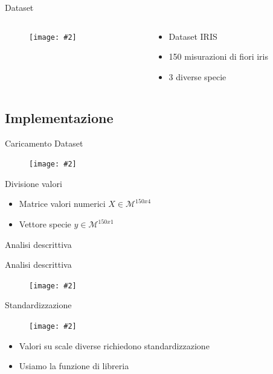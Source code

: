 \documentclass[xcolor={dvipsnames}]{beamer}
\newcommand{\codice}[2]{}
\newcommand{\figcen}[2]{
	\begin{figure}
		\begin{center}
			\texttt{[image: \#2]}
		\end{center}
	\end{figure}
}
\begin{document}
		\begin{frame}{Dataset}
			\begin{columns}
				\begin{column}{.6\textwidth}
					\figcen{\columnwidth}{iris}
				\end{column}
				\begin{column}{.5\textwidth}
					\begin{itemize}
						\item Dataset IRIS
						\item 150 misurazioni di fiori iris 
						\item 3 diverse specie
					\end{itemize}
				\end{column}
			\end{columns}
		\end{frame}

	\subsection{Implementazione}

		\begin{frame}{Caricamento Dataset}
			\codice{16}{25}
			\figcen{.7\textwidth}{tab}
		\end{frame}

		\begin{frame}{Divisione valori}
			\begin{itemize}
				\item Matrice valori numerici $X \in \mathcal{M}^{150x4}$
				\item Vettore specie $y \in \mathcal{M}^{150x1}$
			\end{itemize}
			\codice{30}{32}
		\end{frame}

		\begin{frame}{Analisi descrittiva}
			\codice{37}{56}
		\end{frame}
	
		\begin{frame}{Analisi descrittiva}
			\figcen{.7\textwidth}{isto}
		\end{frame}
	
		\begin{frame}{Standardizzazione}
			\figcen{.35\textwidth}{standard}
			\begin{itemize}
				\item Valori su scale diverse richiedono standardizzazione
				\item Usiamo la funzione di libreria
			\end{itemize}
			\codice{58}{59}
		\end{frame}
	
\end{document}
